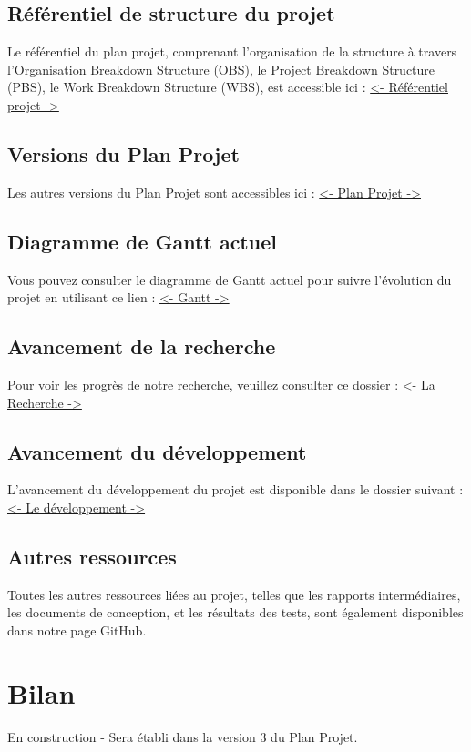 \documentclass[11pt]{rapport_class}
\begin{document}
\section{Référentiel de structure du projet}
\qquad Le référentiel du plan projet, comprenant l'organisation de la structure à travers l'Organisation Breakdown Structure (OBS), le Project Breakdown Structure (PBS), le Work Breakdown Structure (WBS), est accessible ici :
\href{https://github.com/fghjklm/Projet_M1_CheckThat-/tree/main/referentiel_projet}{<- Référentiel projet ->}

\section{Versions du Plan Projet}
\qquad Les autres versions du Plan Projet sont accessibles ici :
\href{https://github.com/fghjklm/Projet_M1_CheckThat-/tree/main/plan_projet}{<- Plan Projet ->}

\section{Diagramme de Gantt actuel}
\qquad Vous pouvez consulter le diagramme de Gantt actuel pour suivre l'évolution du projet en utilisant ce lien :
\href{https://github.com/fghjklm/Projet_M1_CheckThat-/tree/main/gantt}{<- Gantt ->}

\section{Avancement de la recherche}
\qquad Pour voir les progrès de notre recherche, veuillez consulter ce dossier :
\href{https://github.com/fghjklm/Projet_M1_CheckThat-/tree/main/articles}{<- La Recherche ->}

\section{Avancement du développement}
\qquad L'avancement du développement du projet est disponible dans le dossier suivant :
\href{https://github.com/fghjklm/Projet_M1_CheckThat-/tree/main/code}{<- Le développement ->}

\section{Autres ressources}
\qquad Toutes les autres ressources liées au projet, telles que les rapports intermédiaires, les documents de conception, et les résultats des tests, sont également disponibles dans notre page GitHub.


\chapter{\quad Bilan}
\centerline{En construction - Sera établi dans la version 3 du Plan Projet.}
\end{document}
